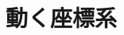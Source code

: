 \documentclass[../../all/physics-standard_questions_all.tex]{subfiles}
\begin{document}
\section{動く座標系}
\end{document}
